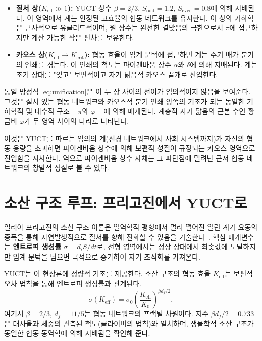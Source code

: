 \documentclass[11pt,a4paper]{article}
\newcommand{\Keff}{K_{\mathrm{eff}}}
\begin{document}
	\begin{itemize}
		\item \textbf{질서 상(\(K_{\mathrm{eff}} \gg 1\)):} YUCT 상수 \(\beta = 2/3\), \(S_{\mathrm{odd}} = 1.2\), \(S_{\mathrm{even}} = 0.8\)에 의해 지배된다. 이 영역에서 계는 안정된 고효율의 협동 네트워크를 유지한다. 이 상의 기하학은 근사적으로 유클리드적이며, 원 상수는 완전한 결맞음의 극한으로서 \(\pi\)에 접근하지만 계산 가능한 작은 편차를 보유한다.
		
		\item \textbf{카오스 상(\(K_{\mathrm{eff}} \to K_{\mathrm{crit}}\)):} 협동 효율이 임계 문턱에 접근하면 계는 주기 배가 분기의 연쇄를 겪는다. 이 연쇄의 척도는 파이겐바움 상수 \(\alpha\)와 \(\delta\)에 의해 지배된다. 계는 초기 상태를 "잊고" 보편적이고 자기 닮음적 카오스 끌개로 진입한다.
	\end{itemize}
	
	통일 방정식 \eqref{eq:unification}은 이 두 상 사이의 전이가 임의적이지 않음을 보여준다. 그것은 질서 있는 협동 네트워크와 카오스적 분기 연쇄 양쪽의 기초가 되는 동일한 기하학적 및 대수적 구조 – \(\pi\)와 \(\varphi\) – 에 의해 매개된다. 계층적 자기 닮음의 근본 수인 황금비 \(\varphi\)가 두 영역 사이의 다리로 나타난다.
	
	이것은 YUCT를 따르는 임의의 계(신경 네트워크에서 사회 시스템까지)가 자신의 협동 용량을 초과하면 파이겐바움 상수에 의해 보편적 성질이 규정되는 카오스 영역으로 진입함을 시사한다. 역으로 파이겐바움 상수 자체는 그 파단점에 밀려난 근저 협동 네트워크의 창발적 성질로 볼 수 있다.
	
	\section{소산 구조 루프: 프리고진에서 YUCT로}
	\label{sec:prigogine}
	
	일리야 프리고진의 소산 구조 이론은 열역학적 평형에서 멀리 떨어진 열린 계가 요동의 증폭을 통해 자연발생적으로 질서를 향해 진화할 수 있음을 기술한다~\cite{Prigogine1977}. 핵심 매개변수는 \textbf{엔트로피 생성률} \(\sigma = d_iS/dt\)로, 선형 영역에서는 정상 상태에서 최솟값에 도달하지만 임계 문턱을 넘으면 극적으로 증가하여 자기 조직화를 가져온다.
	
	YUCT는 이 현상론에 정량적 기초를 제공한다. 소산 구조의 협동 효율 \(K_{\mathrm{eff}}\)는 보편적 오차 법칙을 통해 엔트로피 생성률과 관계된다.
	\begin{equation}
		\sigma(\Keff) = \sigma_0 \left( \frac{\Keff}{K_0} \right)^{\beta d_f / 2},
		\label{eq:sigma-keff}
	\end{equation}
	여기서 \(\beta = 2/3\), \(d_f = 11/5\)는 협동 네트워크의 프랙털 차원이다. 지수 \(\beta d_f / 2 = 0.733\)은 대사율과 체중의 관측된 척도(클라이버의 법칙)와 일치하며, 생물학적 소산 구조가 동일한 협동 동역학에 의해 지배됨을 확인해 준다.
	
\end{document}
